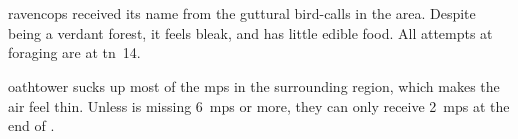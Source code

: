 \section{}
\label{ravencops}

\Gls{ravencops} received its name from the guttural bird-calls in the area.
Despite being a verdant forest, it feels bleak, and has little edible food.
All attempts at \gls{foraging} are at \gls{tn}~14.

\Gls{oathtower} sucks up most of the \glspl{mp} in the surrounding \gls{region}, which makes the air feel thin.
Unless  is missing 6~\glspl{mp} or more, they can only receive 2~\glspl{mp} at the end of .



